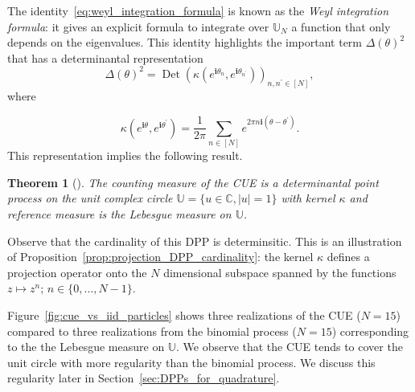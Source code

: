\documentclass[twoside,11pt]{book}
\newtheorem{theorem}{Theorem}
\numberwithin{theorem}{chapter}
\numberwithin{definition}{chapter}
\numberwithin{proposition}{chapter}
\numberwithin{corollary}{chapter}
\numberwithin{example}{chapter}
\numberwithin{lemma}{chapter}
\numberwithin{assumption}{chapter}
\numberwithin{equation}{chapter}
\numberwithin{figure}{chapter}
\DeclareMathOperator{\Det}{Det}
\begin{document}
 


The identity~\eqref{eq:weyl_integration_formula} is known as the \emph{Weyl integration formula}: it gives an explicit formula to integrate  over $\mathbb{U}_N$ a function that only depends on the eigenvalues. This identity highlights the important term $\Delta(\theta)^{2}$ that has a determinantal representation
\begin{equation}
\Delta(\theta)^{2} = \Det (\kappa(e^{\mathbf{i}\theta_{n}},e^{\mathbf{i}\theta_{n^{'}}}))_{n,n^{'} \in [N]},
\end{equation}
where

\begin{equation}
\kappa(e^{\mathbf{i}\theta},e^{\mathbf{i}\theta^{'}}) = \frac{1}{2 \pi}\sum\limits_{n \in [N]} e^{2 \pi n \mathbf{i}(\theta-\theta^{'})}.
\end{equation}
This representation implies the following result.
\begin{theorem}[\cite{Dys62}]\label{thm:CUE_is_DPP}
The counting measure of the CUE is a determinantal point process on the unit complex circle $\mathbb{U} = \{ u \in \mathbb{C}, |u| =1 \}$ with kernel $\kappa$ and reference measure is the Lebesgue measure on $\mathbb{U}$.

\end{theorem}
Observe that the cardinality of this DPP is determinsitic. This is an illustration of Proposition~\ref{prop:projection_DPP_cardinality}: the kernel $\kappa$ defines a projection operator onto the $N$ dimensional subspace spanned by the functions $z \mapsto z^{n}$;  $n \in \{0, \dots, N-1 \}$.  

Figure~\ref{fig:cue_vs_iid_particles} shows three realizations of the CUE ($N = 15$) compared to three realizations from the binomial process ($N = 15$) corresponding to the the Lebesgue measure on $\mathbb{U}$. We observe that the CUE tends to cover the unit circle with more regularity than the binomial process. We discuss this regularity later in Section~\ref{sec:DPPs_for_quadrature}.



\end{document}

